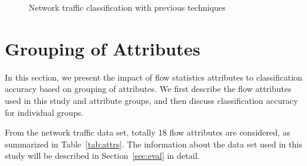 \documentclass[conference]{IEEEtran}
\begin{document}
\begin{figure}[t]
 \centering
 \hspace{.3in}
 \caption{Network traffic classification with previous techniques
 }
 \label{fig:previous}
\end{figure}



\section{Grouping of Attributes}
\label{sec:grouping}

In this section, we present the impact of flow statistics attributes to classification accuracy based on grouping of attributes.
We first describe the flow attributes used in this study and attribute groups, and then discuss classification accuracy for individual groups.

From the network traffic data set, totally 18 flow attributes are considered, as summarized in Table~\ref{tab:attrs}.
The information about the data set used in this study will be described in Section~\ref{sec:eval} in detail.
\end{document}
